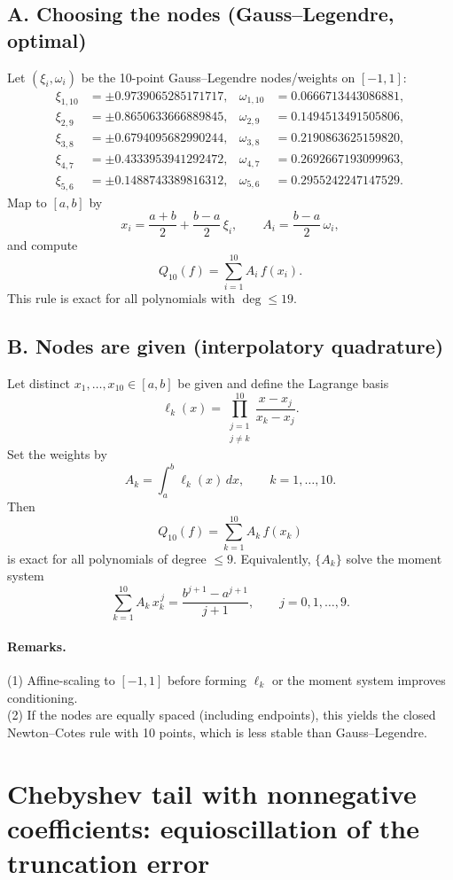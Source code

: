 \documentclass[11pt,a4paper]{article}
\theoremstyle{definition}
\theoremstyle{definition}
\theoremstyle{plain}
\theoremstyle{remark}
\begin{document}
\subsection*{A. Choosing the nodes (Gauss--Legendre, optimal)}
Let \((\xi_i,\omega_i)\) be the 10-point Gauss--Legendre nodes/weights on \([-1,1]\):
\[
\begin{aligned}
	\xi_{1,10}&=\pm 0.9739065285171717, & \omega_{1,10}&=0.0666713443086881,\\
	\xi_{2,9} &=\pm 0.8650633666889845, & \omega_{2,9} &=0.1494513491505806,\\
	\xi_{3,8} &=\pm 0.6794095682990244, & \omega_{3,8} &=0.2190863625159820,\\
	\xi_{4,7} &=\pm 0.4333953941292472, & \omega_{4,7} &=0.2692667193099963,\\
	\xi_{5,6} &=\pm 0.1488743389816312, & \omega_{5,6} &=0.2955242247147529.
\end{aligned}
\]
Map to \([a,b]\) by
\[
x_i=\frac{a+b}{2}+\frac{b-a}{2}\,\xi_i,\qquad
A_i=\frac{b-a}{2}\,\omega_i,
\]
and compute
\[
Q_{10}(f)=\sum_{i=1}^{10} A_i\,f(x_i).
\]
This rule is exact for all polynomials with \(\deg\le 19\).

\subsection*{B. Nodes are given (interpolatory quadrature)}
Let distinct \(x_1,\dots,x_{10}\in[a,b]\) be given and define the Lagrange basis
\[
\ell_k(x)=\prod_{\substack{j=1\\ j\ne k}}^{10}\frac{x-x_j}{x_k-x_j}.
\]
Set the weights by
\[
A_k=\int_a^b \ell_k(x)\,dx,\qquad k=1,\dots,10.
\]
Then
\[
Q_{10}(f)=\sum_{k=1}^{10} A_k\,f(x_k)
\]
is exact for all polynomials of degree \(\le 9\).
Equivalently, \(\{A_k\}\) solve the moment system
\[
\sum_{k=1}^{10} A_k\,x_k^{\,j}=\frac{b^{j+1}-a^{j+1}}{j+1},\qquad j=0,1,\dots,9.
\]

\paragraph{Remarks.}
(1) Affine-scaling to \([-1,1]\) before forming \(\ell_k\) or the moment system improves conditioning.\\
(2) If the nodes are equally spaced (including endpoints), this yields the closed Newton--Cotes rule with 10 points, which is less stable than Gauss--Legendre.

\section*{Chebyshev tail with nonnegative coefficients: equioscillation of the truncation error}
\end{document}
